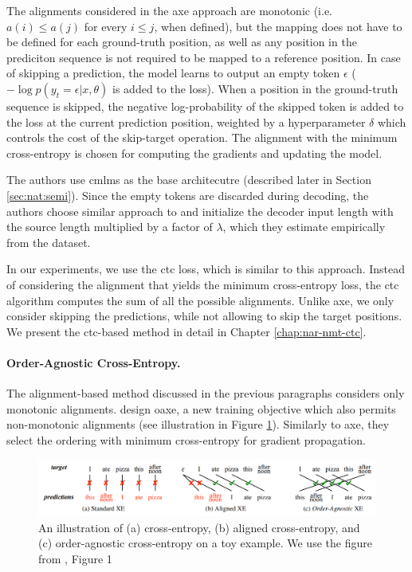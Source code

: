 The alignments considered in the \ac{axe} approach are monotonic (i.e.
$a(i) \leq a(j)$ for every $i \leq j$, when defined), but the mapping does not
have to be defined for each ground-truth position, as well as any position in
the prediciton sequence is not required to be mapped to a reference position.
In case of skipping a prediction, the model learns to output an empty token
$\epsilon$ ($-\log p(y_t = \epsilon | x, \theta)$ is added to the loss).  When
a position in the ground-truth sequence is skipped, the negative
log-probability of the skipped token is added to the loss at the current
prediction position, weighted by a hyperparameter $\delta$ which controls the
cost of the skip-target operation.  The alignment with the minimum
cross-entropy is chosen for computing the gradients and updating the model.

The authors use \aclp{cmlm} as the base architecutre (described later in
Section \ref{sec:nat:semi}).  Since the empty tokens are discarded during
decoding, the authors choose similar approach to
\citet{libovicky-helcl-2018-end} and initialize the decoder input length with
the source length multiplied by a factor of $\lambda$, which they estimate
empirically from the dataset.

In our experiments, we use the \ac{ctc} loss, which is similar to this
approach. Instead of considering the alignment that yields the minimum
cross-entropy loss, the \ac{ctc} algorithm computes the sum of all the possible
alignments. Unlike \ac{axe}, we only consider skipping the predictions, while
not allowing to skip the target positions. We present the \ac{ctc}-based method
in detail in Chapter \ref{chap:nar-nmt-ctc}.

\paragraph{Order-Agnostic Cross-Entropy.} The alignment-based method discussed
in the previous paragraphs considers only monotonic
alignments. \citet{du2021orderagnostic} design \ac{oaxe}, a new training
objective which also permits non-monotonic alignments (see illustration in
Figure \ref{fig:oaxe-example}). Similarly to \ac{axe}, they select the ordering
with minimum cross-entropy for gradient propagation.

\begin{figure}
  \centering
  \includegraphics[width=\textwidth]{img/oaxe.png}

  \caption{An illustration of (a) cross-entropy, (b) aligned cross-entropy, and
    (c) order-agnostic cross-entropy on a toy example. We use the figure from
    \citet{du2021orderagnostic}, Figure 1}%
  \label{fig:oaxe-example}
\end{figure}

